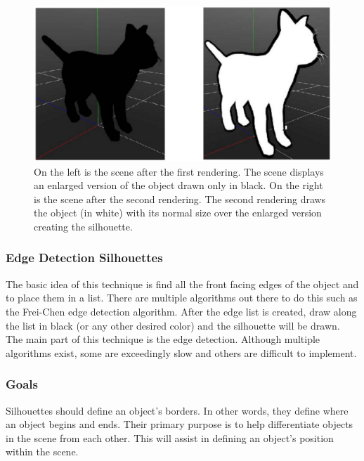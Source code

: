 \documentclass[10pt,journal,compsoc,draftclsnofoot]{IEEEtran}
\begin{document}
\begin{figure} [H]
  \includegraphics[scale=0.5]{four.eps}
  \caption
{ \newline \hspace{\linewidth}
On the left is the scene after the first rendering. The scene displays an enlarged version of the object drawn only in black. On the right is the scene after the second rendering. The second rendering draws the object (in white) with its normal size over the enlarged version creating the silhouette.}
  \label{fig:four}
\end{figure}

\subsubsection{Edge Detection Silhouettes}
The basic idea of this technique is find all the front facing edges of the object and to place them in a list.
There are multiple algorithms out there to do this such as the Frei-Chen edge detection algorithm. \cite{edgedetector}
After the edge list is created, draw along the list in black (or any other desired color) and the silhouette will be drawn. \cite{toonshading}
The main part of this technique is the edge detection. 
Although multiple algorithms exist, some are exceedingly slow and others are difficult to implement.

\subsubsection{Goals}
Silhouettes should define an object's borders. 
In other words, they define where an object begins and ends.
Their primary purpose is to help differentiate objects in the scene from each other.
This will assist in defining an object's position within the scene.
\end{document}
